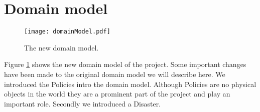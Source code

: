\section{Domain model}
\begin{figure}[htb]
\centering
\texttt{[image: domainModel.pdf]}
\caption{The new domain model.}
\label{fig:newDomainModel}
\end{figure}
Figure \ref{fig:newDomainModel} shows the new domain model of the project. Some important changes have been made to the original domain model we will describe here. We introduced the Policies intro the domain model. Although Policies are no physical objects in the world they are a prominent part of the project and play an important role. Secondly we introduced a Disaster.